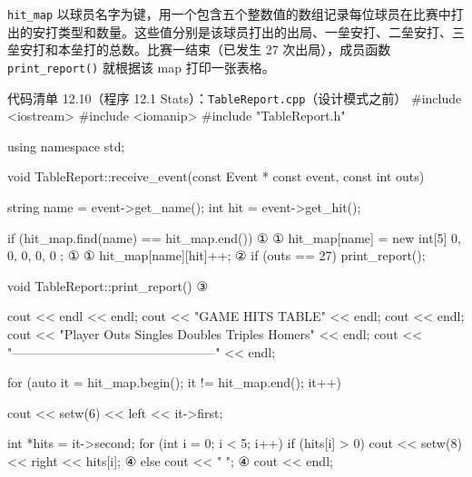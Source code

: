 \texttt{hit\_map} 以球员名字为键，用一个包含五个整数值的数组记录每位球员在比赛中打出的安打类型和数量。这些值分别是该球员打出的出局、一垒安打、二垒安打、三垒安打和本垒打的总数。比赛一结束（已发生 27 次出局），成员函数 \texttt{print\_\allowbreak{}report(\allowbreak{})\allowbreak{}} 就根据该 map 打印一张表格。

\begin{codeboxt}{代码清单 12.10（程序 12.1 Stats）：\texttt{Table\allowbreak{}Report.\allowbreak{}cpp}（设计模式之前）}
#include <iostream>
#include <iomanip>
#include "TableReport.h"

using namespace std;

void TableReport::receive_event(const Event * const event,
                                const int outs)
{
    string  name = event->get_name();
    int     hit  = event->get_hit();

    if (hit_map.find(name) == hit_map.end())                     ①
    {                                                            ①
        hit_map[name] = new int[5] { 0, 0, 0, 0, 0 };            ①
    }                                                            ①
    hit_map[name][hit]++;                                        ②
    if (outs == 27) print_report();
}

void TableReport::print_report()                                 ③
{
    cout << endl << endl;
    cout << "GAME HITS TABLE" << endl;
    cout << endl;
    cout << "Player     Outs   Singles Doubles Triples Homers"
         << endl;
    cout << "------------------------------------------------"
         << endl;

    for (auto it = hit_map.begin(); it != hit_map.end(); it++)
    {
        cout << setw(6) << left << it->first;

        int *hits = it->second;
        for (int i = 0; i < 5; i++)
        {
            if (hits[i] > 0) cout << setw(8) << right << hits[i]; ④
            else             cout << "        ";                  ④
        }
        cout << endl;
    }
}
\end{codeboxt}
\par
{}\par
{}\par
{}\par

